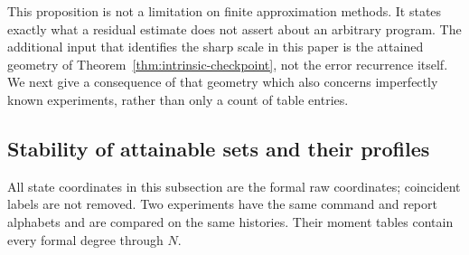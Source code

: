 \documentclass[11pt]{amsart}
\theoremstyle{definition}\newtheorem{definition}[theorem]{Definition}
\theoremstyle{remark}\newtheorem{remark}[theorem]{Remark}
\begin{document}
This proposition is not a limitation on finite approximation methods.
It states exactly what a residual estimate does not assert about an
arbitrary program. The additional input that identifies the sharp
scale in this paper is the attained geometry of
Theorem~\ref{thm:intrinsic-checkpoint}, not the error recurrence itself.
We next give a consequence of that geometry which also concerns
imperfectly known experiments, rather than only a count of table entries.

\subsection{Stability of attainable sets and their profiles}
All state coordinates in this subsection are the formal raw coordinates;
coincident labels are not removed. Two experiments have the same
command and report alphabets and are compared on the same histories.
Their moment tables contain every formal degree through $N$.
\end{document}

